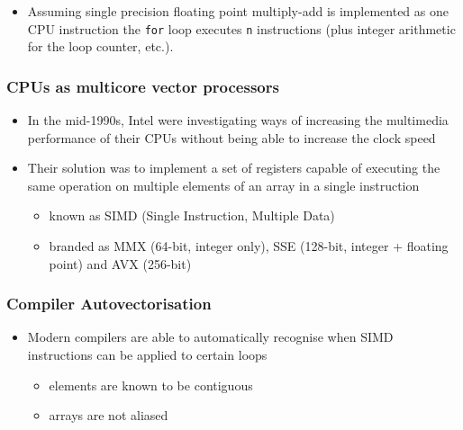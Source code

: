 \begin{itemize}
\itemsep1pt\parskip0pt
\item
  Assuming single precision floating point multiply-add is implemented
  as one CPU instruction the \texttt{for} loop executes \texttt{n}
  instructions (plus integer arithmetic for the loop counter, etc.).
\end{itemize}

\subsubsection{CPUs as multicore vector
processors}\label{cpus-as-multicore-vector-processors}

\begin{itemize}
\itemsep1pt\parskip0pt
\item
  In the mid-1990s, Intel were investigating ways of increasing the
  multimedia performance of their CPUs without being able to increase
  the clock speed
\item
  Their solution was to implement a set of registers capable of
  executing the same operation on multiple elements of an array in a
  single instruction

  \begin{itemize}
  \itemsep1pt\parskip0pt
  \item
    known as SIMD (Single Instruction, Multiple Data)
  \item
    branded as MMX (64-bit, integer only), SSE (128-bit, integer +
    floating point) and AVX (256-bit)
  \end{itemize}
\end{itemize}

\subsubsection{Compiler
Autovectorisation}\label{compiler-autovectorisation}

\begin{itemize}
\itemsep1pt\parskip0pt
\item
  Modern compilers are able to automatically recognise when SIMD
  instructions can be applied to certain loops

  \begin{itemize}
  \itemsep1pt\parskip0pt
  \item
    elements are known to be contiguous
  \item
    arrays are not aliased
  \end{itemize}
\end{itemize}

